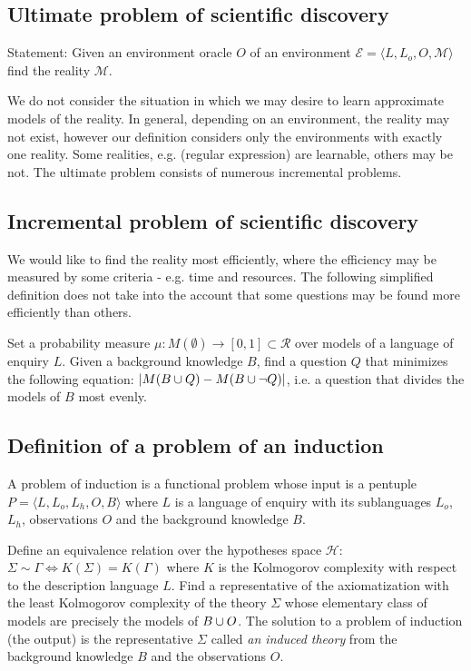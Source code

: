 \subsection{Ultimate problem of scientific discovery}
Statement: Given an environment oracle $O$ of an environment $\mathcal{E}=\langle L, L_o, O, \mathcal{M} \rangle$ find the reality $\mathcal{M}$.

We do not consider the situation in which we may desire to learn approximate models of the reality. In general, depending on an environment, the reality may not exist, however our definition considers only the environments with exactly one reality. Some realities, e.g. (regular expression) are learnable, others may be not. The ultimate problem consists of numerous incremental problems.

\subsection{Incremental problem of scientific discovery}
We would like to find the reality most efficiently, where the efficiency may be measured by some criteria - e.g. time and resources. The following simplified definition does not take into the account that some questions may be found more efficiently than others.

Set a probability measure $\mu:M(\emptyset) \to [0,1] \subset \mathcal{R}$ over models of a language of enquiry $L$. Given a background knowledge $B$, find a question $Q$ that minimizes the following equation: $|M(B \cup {Q})-M(B \cup {\neg Q})|$, i.e. a question that divides the models of $B$ most evenly.

\subsection{Definition of a problem of an induction}
A problem of induction is a functional problem whose input is a pentuple $P=\langle L, L_o, L_h, O, B\rangle$ where $L$ is a language of enquiry with its sublanguages $L_o$, $L_h$, observations $O$ and the background knowledge $B$.

Define an equivalence relation over the hypotheses space $\mathcal{H}$: $\Sigma \sim \Gamma \iff K(\Sigma)=K(\Gamma)$ where $K$ is the Kolmogorov complexity with respect to the description language $L$. Find a representative of the axiomatization with the least Kolmogorov complexity of the theory $\Sigma$ whose elementary class of models are precisely the models of $B \cup O$. The solution  to a problem of induction (the output) is the representative $\Sigma$ called \emph{an induced theory} from the background knowledge $B$ and the observations $O$.

